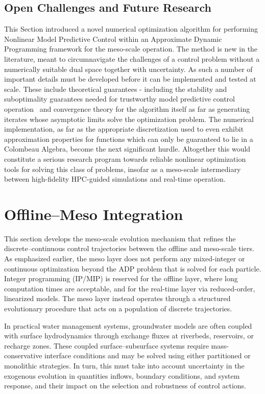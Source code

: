 \documentclass{article}
\newcommand{\1}{\mathds{1}}          %
\theoremstyle{definition}
\begin{document}
\begin{sloppypar}
\subsection{Open Challenges and Future Research}
This Section introduced a novel numerical optimization algorithm for performing Nonlinear Model Predictive Control within an Approximate Dynamic Programming framework for the meso-scale operation. The method is new in the literature, meant to circumnavigate the challenges of a control problem without a numerically suitable dual space together with uncertainty. As such a number of important details must be developed before it can be implemented and tested at scale. These include theoretical guarantees - including the stability and suboptimality guarantees needed for trustworthy model predictive control operation~\cite{allgower2012nonlinear} and convergence theory for the algorithm itself as far as generating iterates whose asymptotic limits solve the optimization problem. The numerical implementation, as far as the appropriate discretization used to even exhibit approximation properties for functions which can only be guaranteed to lie in a Colombeau Algebra, become the next significant hurdle. Altogether this would constitute a serious research program towards reliable nonlinear optimization tools for solving this class of problems, insofar as a meso-scale intermediary between high-fidelity HPC-guided simulations and real-time operation. 


\section{Offline--Meso Integration}



This section develops the meso-scale evolution mechanism that refines the discrete--continuous control trajectories between the offline and meso-scale tiers. 
As emphasized earlier, the meso layer does not perform any mixed-integer or continuous optimization beyond the ADP problem that is solved for each particle. Integer programming (IP/MIP) is reserved for the offline layer, where long computation times are acceptable, and for the real-time layer via reduced-order, 
linearized models. The meso layer instead operates through a structured evolutionary procedure that 
acts on a population of discrete trajectories.


In practical water management systems, groundwater models are often coupled with surface hydrodynamics through exchange fluxes at riverbeds, reservoirs, or recharge zones. These coupled surface–subsurface systems require mass-conservative interface conditions and may be solved using either partitioned or monolithic strategies. In turn, this must take into account uncertainty in the exogenous evolution in quantities inflows, boundary conditions, and system response, and their impact on the selection and robustness of control actions.




\end{sloppypar}
\end{document}
